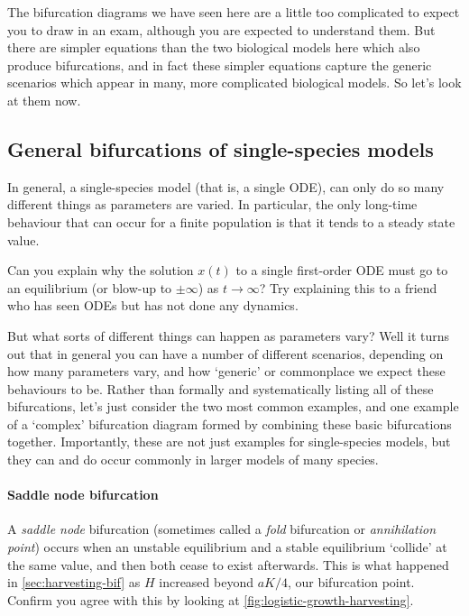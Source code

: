 \documentclass[main.tex]{subfiles}
\begin{document}
The bifurcation diagrams we have seen here are a little too complicated to expect you to draw in an exam, although you are expected to understand them. But there are simpler equations than the two biological models here which also produce bifurcations, and in fact these simpler equations capture the generic scenarios which appear in many, more complicated biological models. So let's look at them now.

\subsection{General bifurcations of single-species models}
In general, a single-species model (that is, a single ODE), can only do so many different things as parameters are varied. In particular, the only long-time behaviour that can occur for a finite population is that it tends to a steady state value. 

\begin{do-it-yourself}
Can you explain why the solution $x(t)$ to a single first-order ODE must go to an equilibrium (or blow-up to $\pm \infty$) as $t \to \infty$? Try explaining this to a friend who has seen ODEs but has not done any dynamics. 
\end{do-it-yourself}


But what sorts of different things can happen as parameters vary? Well it turns out that in general you can have a number of different scenarios, depending on how many parameters vary, and how `generic' or commonplace we expect these behaviours to be. Rather than formally and systematically listing all of these bifurcations, let's just consider the two most common examples, and one example of a `complex' bifurcation diagram formed by combining these basic bifurcations together. Importantly, these are not just examples for single-species models, but they can and do occur commonly in larger models of many species.

\paragraph{Saddle node bifurcation} A \emph{saddle node} bifurcation (sometimes called a \emph{fold} bifurcation or \emph{annihilation point})  occurs when an unstable equilibrium and a stable equilibrium `collide' at the same value, and then both cease to exist afterwards. This is what happened in \cref{sec:harvesting-bif} as $H$ increased beyond $aK/4$, our bifurcation point. Confirm you agree with this by looking at \cref{fig:logistic-growth-harvesting}.
\end{document}
